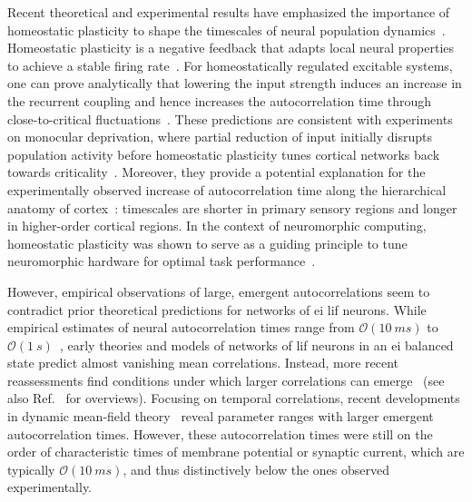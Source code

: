 
Recent theoretical and experimental results have emphasized the importance of homeostatic plasticity to shape the timescales of neural population dynamics~\cite{zierenberg_homeostatic_2018, kossio_growing_2018, ma_cortical_2019}.
Homeostatic plasticity is a negative feedback that adapts local neural properties to achieve a stable firing rate~\cite{turrigiano_activity-dependent_1998, turrigiano_homeostatic_2004, turrigiano_homeostatic_2012}.
For homeostatically regulated excitable systems, one can prove analytically that lowering the input strength induces an increase in the recurrent coupling and hence increases the autocorrelation time through close-to-critical fluctuations~\cite{zierenberg_homeostatic_2018, kossio_growing_2018}.
These predictions are consistent with experiments on monocular deprivation, where partial reduction of input initially disrupts population activity before homeostatic plasticity tunes cortical networks back towards criticality~\cite{ma_cortical_2019}.
Moreover, they provide a potential explanation for the experimentally observed increase of autocorrelation time along the hierarchical anatomy of cortex~\cite{murray_hierarchy_2014, hasson_hierarchical_2015, raut_hierarchical_2020, spitmaan_multiple_2020, gao_neuronal_2020, siegle_survey_2021}: timescales are shorter in primary sensory regions and longer in higher-order cortical regions.
In the context of neuromorphic computing, homeostatic plasticity was shown to serve as a guiding principle to tune neuromorphic hardware for optimal task performance~\cite{cramer_control_2020}.

%
However, empirical observations of large, emergent autocorrelations seem to contradict prior theoretical predictions for networks of \gls{ei} \gls{lif} neurons.
While empirical estimates of neural autocorrelation times range from $\mathcal{O}(\SI{10}{ms})$ to $\mathcal{O}(\SI{1}{s})$~\cite{murray_hierarchy_2014, hasson_hierarchical_2015, raut_hierarchical_2020, spitmaan_multiple_2020, gao_neuronal_2020, siegle_survey_2021, wasmuht_intrinsic_2018, cavanagh_reconciling_2018, wilting_operating_2018, wilting_between_2019}, early theories and models of networks of \gls{lif} neurons in an \gls{ei} balanced state \cite{vreeswijk_chaos_1996,renart_asynchronous_2010} predict almost vanishing mean correlations.
Instead, more recent reassessments find conditions under which larger correlations can emerge~\cite{harish_asynchronous_2015, rosenbaum_spatial_2017, mastrogiuseppe_intrinsically-generated_2017, baker_correlated_2019} (see also Ref.~\cite{latham_correlations_2017, dahmen_global_2022} for overviews).
Focusing on temporal correlations, recent developments in dynamic mean-field theory~\cite{ostojic_two_2014, mastrogiuseppe_intrinsically-generated_2017, van_meegen_microscopic_2021} reveal parameter ranges with larger emergent autocorrelation times.
However, these autocorrelation times were still on the order of characteristic times of membrane potential or synaptic current, which are typically $\mathcal{O}(\SI{10}{ms})$, and thus distinctively below the ones observed experimentally.

